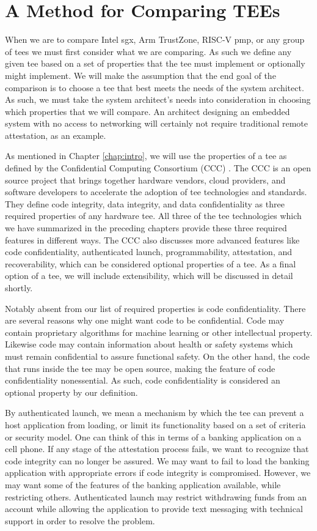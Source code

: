 \section{A Method for Comparing TEEs}
When we are to compare Intel \gls{sgx}, Arm TrustZone, RISC-V \gls{pmp}, or any group of \glspl{tee} we must first consider what we are comparing. As such we define any given \gls{tee} based on a set of properties that the \gls{tee} must implement or optionally might implement. We will make the assumption that the end goal of the comparison is to choose a \gls{tee} that best meets the needs of the system architect. As such, we must take the system architect's needs into consideration in choosing which properties that we will compare. An architect designing an embedded system with no access to networking will certainly not require traditional remote \gls{attestation}, as an example. 

As mentioned in Chapter \ref{chap:intro}, we will use the properties of a \gls{tee} as defined by the Confidential Computing Consortium (CCC) \cite{cccTAC}. The CCC is an open source project that brings together hardware vendors, cloud providers, and software developers to accelerate the adoption of \gls{tee} technologies and standards. They define code integrity, data integrity, and data confidentiality as three required properties of any hardware \gls{tee}. All three of the \gls{tee} technologies which we have summarized in the preceding chapters provide these three required features in different ways. The CCC also discusses more advanced features like code confidentiality, authenticated launch, programmability, \gls{attestation}, and recoverability, which can be considered optional properties of a \gls{tee}. As a final option of a \gls{tee}, we will include extensibility, which will be discussed in detail shortly.

Notably absent from our list of required properties is code confidentiality. There are several reasons why one might want code to be confidential. Code may contain proprietary algorithms for machine learning or other intellectual property. Likewise code may contain information about health or safety systems which must remain confidential to assure functional safety. On the other hand, the code that runs inside the \gls{tee} may be open source, making the feature of code confidentiality nonessential. As such, code confidentiality is considered an optional property by our definition.

By authenticated launch, we mean a mechanism by which the \gls{tee} can prevent a host application from loading, or limit its functionality based on a set of criteria or security model. One can think of this in terms of a banking application on a cell phone. If any stage of the \gls{attestation} process fails, we want to recognize that code integrity can no longer be assured. We may want to fail to load the banking application with appropriate errors if code integrity is compromised. However, we may want some of the features of the banking application available, while restricting others. Authenticated launch may restrict withdrawing funds from an account while allowing the application to provide text messaging with technical support in order to resolve the problem.

